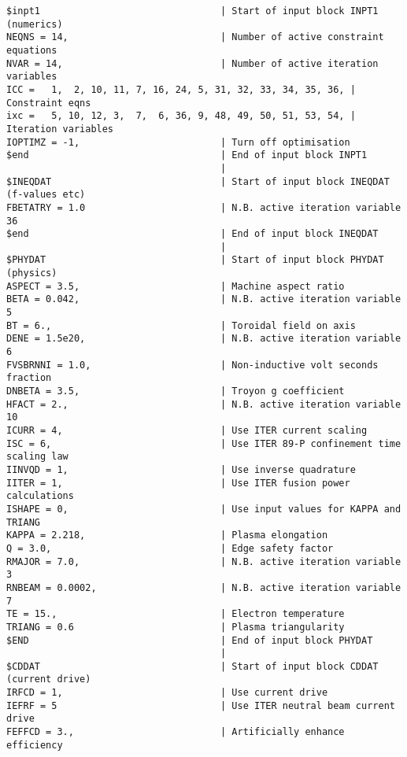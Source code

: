\documentclass[11pt,a4paper]{report}
\begin{document}
\footnotesize
\begin{verbatim}
$inpt1                                | Start of input block INPT1 (numerics)
NEQNS = 14,                           | Number of active constraint equations
NVAR = 14,                            | Number of active iteration variables
ICC =   1,  2, 10, 11, 7, 16, 24, 5, 31, 32, 33, 34, 35, 36, | Constraint eqns
ixc =   5, 10, 12, 3,  7,  6, 36, 9, 48, 49, 50, 51, 53, 54, | Iteration variables
IOPTIMZ = -1,                         | Turn off optimisation
$end                                  | End of input block INPT1
                                      | 
$INEQDAT                              | Start of input block INEQDAT (f-values etc)
FBETATRY = 1.0                        | N.B. active iteration variable 36
$end                                  | End of input block INEQDAT
                                      | 
$PHYDAT                               | Start of input block PHYDAT (physics)
ASPECT = 3.5,                         | Machine aspect ratio
BETA = 0.042,                         | N.B. active iteration variable 5
BT = 6.,                              | Toroidal field on axis
DENE = 1.5e20,                        | N.B. active iteration variable 6
FVSBRNNI = 1.0,                       | Non-inductive volt seconds fraction
DNBETA = 3.5,                         | Troyon g coefficient
HFACT = 2.,                           | N.B. active iteration variable 10
ICURR = 4,                            | Use ITER current scaling
ISC = 6,                              | Use ITER 89-P confinement time scaling law
IINVQD = 1,                           | Use inverse quadrature
IITER = 1,                            | Use ITER fusion power calculations
ISHAPE = 0,                           | Use input values for KAPPA and TRIANG
KAPPA = 2.218,                        | Plasma elongation
Q = 3.0,                              | Edge safety factor
RMAJOR = 7.0,                         | N.B. active iteration variable 3
RNBEAM = 0.0002,                      | N.B. active iteration variable 7
TE = 15.,                             | Electron temperature
TRIANG = 0.6                          | Plasma triangularity
$END                                  | End of input block PHYDAT
                                      | 
$CDDAT                                | Start of input block CDDAT (current drive)
IRFCD = 1,                            | Use current drive
IEFRF = 5                             | Use ITER neutral beam current drive
FEFFCD = 3.,                          | Artificially enhance efficiency

\end{verbatim}
\end{document}
